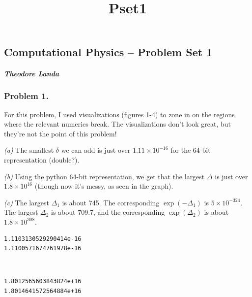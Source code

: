 \documentclass[11pt]{article}
\title{Pset1}
\begin{document}
    
    \maketitle
    
    

    
    \subsection{Computational Physics -- Problem Set
1}\label{computational-physics-problem-set-1}

\subparagraph{\texorpdfstring{\emph{Theodore
Landa}}{Theodore Landa}}\label{theodore-landa}

    \subsubsection{Problem 1.}\label{problem-1.}

For this problem, I used visualizations (figures 1-4) to zone in on the
regions where the relevant numerics break. The visualizations don't look
great, but they're not the point of this problem!

\emph{(a)} The smallest \(\delta\) we can add is just over
\(1.11\times 10^{-16}\) for the 64-bit representation (double?).

\emph{(b)} Using the python 64-bit representation, we get that the
largest \(\Delta\) is just over \(1.8\times 10^{16}\) (though now it's
messy, as seen in the graph).

\emph{(c)} The largest \(\Delta_1\) is about 745. The corresponding
\(\exp(-\Delta_1)\) is \(5\times 10^{-324}\). The largest \(\Delta_2\)
is about 709.7, and the corresponding \(\exp(\Delta_2)\) is about
\(1.8 \times 10^{308}\).

    \begin{Verbatim}[commandchars=\\\{\}]
1.1103130529290414e-16
1.1100571674761978e-16
    \end{Verbatim}

    \begin{center}
    \end{center}
    { \hspace*{\fill} \\}
    
    \begin{Verbatim}[commandchars=\\\{\}]
1.8012565603843824e+16
1.8014641572564884e+16
    \end{Verbatim}
\end{document}
